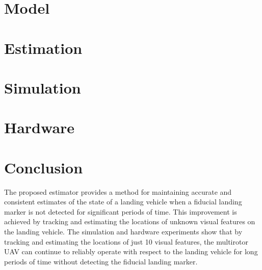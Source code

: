 \documentclass[letterpaper, 10 pt, conference]{ieeeconf}  %
\begin{document}
\section{Model} \label{sec:model}



% 
% 

\section{Estimation} \label{sec:estimation}




% 


\section{Simulation} \label{sec:simulation}


\section{Hardware} \label{sec:hardware}

% 






\section{Conclusion} \label{sec:conclusion}
The proposed estimator provides a method for maintaining accurate and consistent
estimates of the state of a landing vehicle when a fiducial landing marker is
not detected for significant periods of time. This improvement is achieved by
tracking and estimating the locations of unknown visual features on the landing
vehicle. The simulation and hardware experiments show that by tracking and
estimating the locations of just 10 visual features, the multirotor UAV can
continue to reliably operate with respect to the landing vehicle for long
periods of time without detecting the fiducial landing marker.






\end{document}
